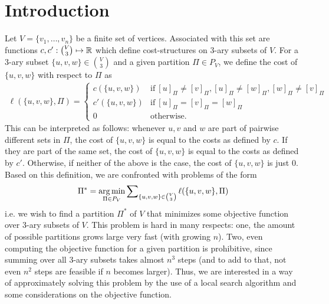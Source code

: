 \section{Introduction}
Let $V = \{ v_1,\dots,v_n \}$ be a finite set of vertices. Associated with this set are functions $c,c': \binom{V}{3} \mapsto \mathbb{R}$ which define cost-structures on $3$-ary subsets of $V$. For a $3$-ary subset $\{u,v,w\} \in \binom{V}{3}$ and a given partition $\Pi \in P_V$, we define the cost of $\{u,v,w\}$ with respect to $\Pi$ as  
\begin{align*}
    \ell(\{u,v,w\},\Pi) = \begin{cases}
        c(\{u,v,w\}) & \text{if}\ [u]_\Pi \neq [v]_\Pi, [u]_\Pi \neq [w]_\Pi, [w]_\Pi \neq [v]_\Pi \\
        c'(\{u,v,w\}) & \text{if}\ [u]_\Pi = [v]_\Pi = [w]_\Pi \\
        0 & \text{otherwise.}
    \end{cases}
\end{align*}
This can be interpreted as follows: whenever $u,v$ and $w$ are part of pairwise different sets in $\Pi$, the cost of $\{u,v,w\}$ is equal to the costs as defined by $c$. If they are part of the same set, the cost of $\{u,v,w\}$ is equal to the costs as defined by $c'$. Otherwise, if neither of the above is the case, the cost of $\{u,v,w\}$ is just $0$. Based on this definition, we are confronted with problems of the form
\begin{align*}
    \Pi^* = \operatorname*{\arg\min}_{\Pi \in P_V} \sum\nolimits_{\{u,v,w\} \in \binom{V}{3}} \ell(\{u,v,w\},\Pi)
\end{align*}
i.e. we wish to find a partition $\Pi^*$ of $V$ that minimizes some objective function over $3$-ary subsets of $V$. This problem is hard in many respects: one, the amount of possible partitions grows large very fast (with growing $n$). Two, even computing the objective function for a given partition is prohibitive, since summing over all $3$-ary subsets takes almost $n^3$ steps (and to add to that, not even $n^2$ steps are feasible if $n$ becomes larger). Thus, we are interested in a way of approximately solving this problem by the use of a local search algorithm and some considerations on the objective function.

